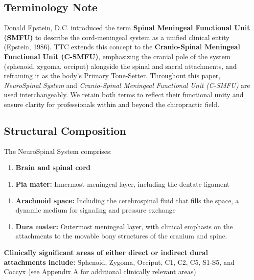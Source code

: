 \documentclass[11pt,letterpaper]{article}
\begin{document}
\subsection{Terminology Note}

Donald Epstein, D.C. introduced the term \textbf{Spinal Meningeal Functional Unit (SMFU)} to describe the cord-meningeal system as a unified clinical entity (Epstein, 1986). TTC extends this concept to the \textbf{Cranio-Spinal Meningeal Functional Unit (C-SMFU)}, emphasizing the cranial pole of the system (sphenoid, zygoma, occiput) alongside the spinal and sacral attachments, and reframing it as the body's Primary Tone-Setter. Throughout this paper, \textit{NeuroSpinal System} and \textit{Cranio-Spinal Meningeal Functional Unit (C-SMFU)} are used interchangeably. We retain both terms to reflect their functional unity and ensure clarity for professionals within and beyond the chiropractic field.


\subsection{Structural Composition}

The NeuroSpinal System comprises:


\begin{enumerate}
\item \textbf{Brain and spinal cord}
\end{enumerate}

\begin{enumerate}
\item \textbf{Pia mater:} Innermost meningeal layer, including the dentate ligament
\end{enumerate}

\begin{enumerate}
\item \textbf{Arachnoid space:} Including the cerebrospinal fluid that fills the space, a dynamic medium for signaling and pressure exchange
\end{enumerate}

\begin{enumerate}
\item \textbf{Dura mater:} Outermost meningeal layer, with clinical emphasis on the attachments to the movable bony structures of the cranium and spine.
\end{enumerate}

\textbf{Clinically significant areas of either direct or indirect dural attachments include:} Sphenoid, Zygoma, Occiput, C1, C2, C5, S1-S5, and Coccyx (see Appendix A for additional clinically relevant areas)
\end{document}
